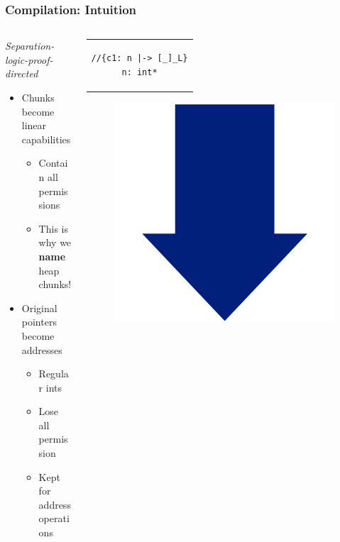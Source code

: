 \documentclass{beamer}
\begin{document}
\begin{frame}[fragile]
\frametitle{Compilation: Intuition}
\begin{columns}
\begin{column}{0.6\textwidth}
\emph{Separation-logic-proof-directed}
\begin{itemize}
\item Chunks become linear capabilities
	\begin{itemize}
	\item Contain all permissions
	\item This is why we \textbf{name} heap chunks!
	\end{itemize}
\item Original pointers become addresses
	\begin{itemize}
	\item Regular ints\footnotemark
	\item Lose all permission
	\item Kept for address operations
	\end{itemize} 
\end{itemize}
\end{column}
\begin{column}{0.4\textwidth}

\begin{center}
\begin{tabular}{c}
\begin{lstlisting}[style=CStyleNoNum, captionpos = t]
//{c1: n |-> [_]_L}
n: int*
\end{lstlisting}
\end{tabular}
\end{center}

\vspace{-.5em}
\begin{figure}[h]
\centering
\includegraphics[width=0.20\linewidth]{BlueArrowVertical}
\end{figure}
\vspace{-1em}


\end{column}
\end{columns}
\end{frame}
\end{document}

